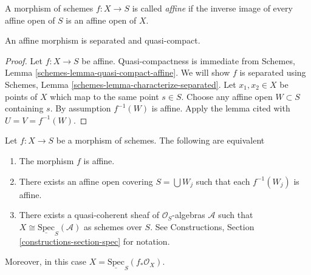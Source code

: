 \begin{definition}
\label{definition-affine}
A morphism of schemes $f : X \to S$ is called {\it affine} if
the inverse image of every affine open of $S$ is an affine
open of $X$.
\end{definition}

\begin{lemma}
\label{lemma-affine-separated}
An affine morphism is separated and quasi-compact.
\end{lemma}

\begin{proof}
Let $f : X \to S$ be affine. Quasi-compactness is immediate from
Schemes, Lemma \ref{schemes-lemma-quasi-compact-affine}.
We will show $f$ is separated using
Schemes, Lemma \ref{schemes-lemma-characterize-separated}. Let
$x_1, x_2 \in X$ be points of $X$ which map to the same point $s \in S$.
Choose any affine open $W \subset S$ containing $s$. By assumption
$f^{-1}(W)$ is affine. Apply the lemma cited with $U = V = f^{-1}(W)$.
\end{proof}

\begin{lemma}
\label{lemma-characterize-affine}
Let $f : X \to S$ be a morphism of schemes.
The following are equivalent
\begin{enumerate}
\item The morphism $f$ is affine.
\item There exists an affine open covering $S = \bigcup W_j$
such that each $f^{-1}(W_j)$ is affine.
\item There exists a quasi-coherent sheaf of $\mathcal{O}_S$-algebras
$\mathcal{A}$ such that $X \cong \underline{\text{Spec}}_S(\mathcal{A})$
as schemes over $S$. See
Constructions, Section \ref{constructions-section-spec} for notation.
\end{enumerate}
Moreover, in this case $X = \underline{\text{Spec}}_S(f_*\mathcal{O}_X)$.
\end{lemma}

